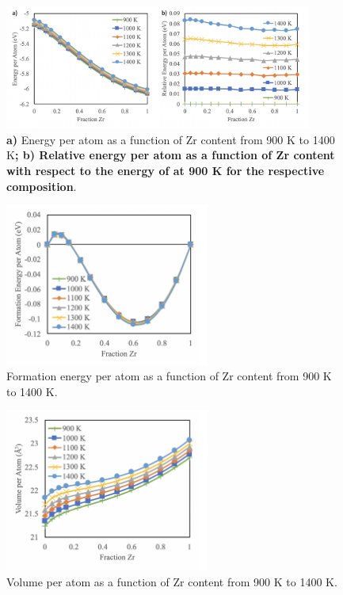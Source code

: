 \documentclass[review]{elsarticle}
\providecommand{\DIFaddtex}[1]{{\bf #1}} %
\providecommand{\DIFaddFL}[1]{\DIFadd{#1}} %
\providecommand{\DIFaddbeginFL}{} %
\providecommand{\DIFaddendFL}{} %
\providecommand{\DIFdelbeginFL}{} %
\providecommand{\DIFdelendFL}{} %
\providecommand{\DIFadd}[1]{\texorpdfstring{\DIFaddtex{#1}}{#1}} %
\newcommand{\DIFscaledelfig}{0.5}
\newlength{\DIFdelgraphicswidth} %
\newlength{\DIFdelgraphicsheight} %
\newcommand{\DIFaddincludegraphics}[2][]{{\color{blue}\fbox{\DIFOincludegraphics[#1]{#2}}}} %
\newcommand{\DIFdelincludegraphics}[2][]{%
\sbox{\DIFdelgraphicsbox}{\DIFOincludegraphics[#1]{#2}}%
\settoboxwidth{\DIFdelgraphicswidth}{\DIFdelgraphicsbox} %
\settoboxtotalheight{\DIFdelgraphicsheight}{\DIFdelgraphicsbox} %
\scalebox{\DIFscaledelfig}{%
\parbox[b]{\DIFdelgraphicswidth}{\usebox{\DIFdelgraphicsbox}\\[-\baselineskip] \rule{\DIFdelgraphicswidth}{0em}}\llap{\resizebox{\DIFdelgraphicswidth}{\DIFdelgraphicsheight}{%
\setlength{\unitlength}{\DIFdelgraphicswidth}%
\begin{picture}(1,1)%
\thicklines\linethickness{2pt} %
{\color[rgb]{1,0,0}\put(0,0){\framebox(1,1){}}}%
{\color[rgb]{1,0,0}\put(0,0){\line( 1,1){1}}}%
{\color[rgb]{1,0,0}\put(0,1){\line(1,-1){1}}}%
\end{picture}%
}\hspace*{3pt}}} %
} %
\DeclareRobustCommand{\DIFaddbeginFL}{\DIFOaddbeginFL \let\includegraphics\DIFaddincludegraphics} %
\DeclareRobustCommand{\DIFaddendFL}{\DIFOaddendFL \let\includegraphics\DIFOincludegraphics} %
\DeclareRobustCommand{\DIFdelbeginFL}{\DIFOdelbeginFL \let\includegraphics\DIFdelincludegraphics} %
\DeclareRobustCommand{\DIFdelendFL}{\DIFOaddendFL \let\includegraphics\DIFOincludegraphics} %
\begin{document}
\begin{figure}[!htp]
\begin{center}
\DIFdelbeginFL %
\DIFdelendFL \DIFaddbeginFL \includegraphics[width=0.9\textwidth]{1_Eperat}
\DIFaddendFL \end{center}
\caption{\DIFaddbeginFL \DIFaddFL{a) }\DIFaddendFL Energy per atom as a function of Zr content from 900 K to 1400 K\DIFaddbeginFL \DIFaddFL{; b) Relative energy per atom as a function of Zr content with respect to the energy of at 900 K for the respective composition}\DIFaddendFL . }
\label{fig:Eperat}
\end{figure}

\begin{figure}[!htp]
\begin{center}
\includegraphics[width=0.6\textwidth]{2_Efperat}
\end{center}
\caption{Formation energy per atom as a function of Zr content from 900 K to 1400 K.  }
\label{fig:Efperat}
\end{figure}

\begin{figure}[!htp]
\begin{center}
\includegraphics[width=0.6\textwidth]{3_Vperat}
\end{center}
\caption{Volume per atom as a function of Zr content from 900 K to 1400 K.  }
\label{fig:Vperat}
\end{figure}
\end{document}
